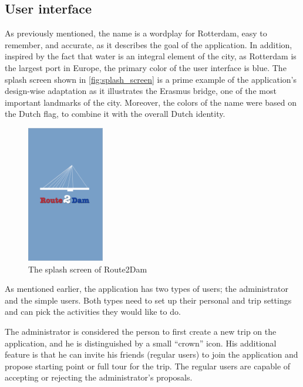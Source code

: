 \documentclass[11pt,a4paper,oneside]{article}
\begin{document}
\subsection{User interface}
As previously mentioned, the name is a wordplay for Rotterdam, easy to remember, and accurate, as it describes the goal of the application. In addition, inspired by the fact that water is an integral element of the city, as Rotterdam is the largest port in Europe, the primary color of the user interface is blue. The splash screen shown in \autoref{fig:splash_screen} is a prime example of the application's design-wise adaptation as it illustrates the Erasmus bridge, one of the most important landmarks of the city. Moreover, the colors of the name were based on the Dutch flag, to combine it with the overall Dutch identity. 

\begin{figure}[H]
    \centering
    \includegraphics[width=0.3\textwidth]{paper/imgs/hifi_prototypes/splash_screen.png}
    \caption{The splash screen of Route2Dam}
    \label{fig:splash_screen}
\end{figure}

As mentioned earlier, the application has two types of users; the administrator and the simple users. Both types need to set up their personal and trip settings and can pick the activities they would like to do. 

The administrator is considered the person to first create a new trip on the application, and he is distinguished by a small “crown” icon. His additional feature is that he can invite his friends (regular users) to join the application and propose starting point or full tour for the trip. The regular users are capable of accepting or rejecting the administrator’s proposals.
\end{document}
